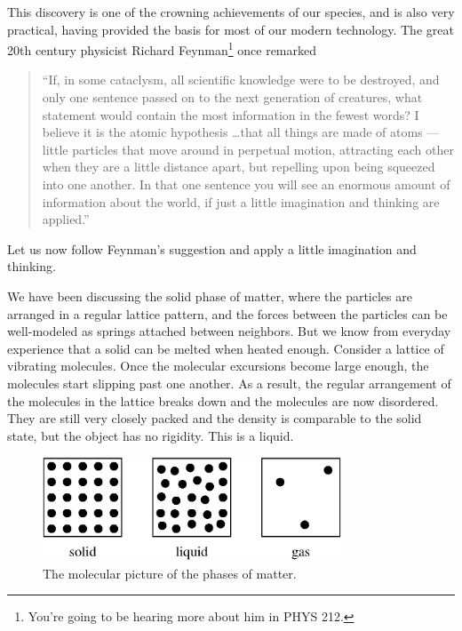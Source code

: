 This discovery is one of the crowning achievements of our species, and
is also very practical, having provided the basis for most of our
modern technology.  The great 20th century physicist Richard
Feynman\footnote{You're going to be hearing more about him in PHYS
  212.} once remarked
\begin{quote}
  ``If, in some cataclysm, all scientific knowledge were to be
  destroyed, and only one sentence passed on to the next generation of
  creatures, what statement would contain the most information in the
  fewest words? I believe it is the atomic hypothesis \dots that all
  things are made of atoms --- little particles that move around in
  perpetual motion, attracting each other when they are a little
  distance apart, but repelling upon being squeezed into one
  another. In that one sentence you will see an enormous amount of
  information about the world, if just a little imagination and
  thinking are applied.''
\end{quote}
Let us now follow Feynman's suggestion and apply a little
imagination and thinking.

We have been discussing the solid phase of matter, where the particles
are arranged in a regular lattice pattern, and the forces between the
particles can be well-modeled as springs attached between neighbors.
But we know from everyday experience that a solid can be melted when
heated enough.  Consider a lattice of vibrating molecules.  Once the
molecular excursions become large enough, the molecules start slipping
past one another.  As a result, the regular arrangement of the
molecules in the lattice breaks down and the molecules are now
disordered.  They are still very closely packed and the density is
comparable to the solid state, but the object has no rigidity.  This
is a liquid.


\begin{figure}
\begin{center}
\includegraphics[width=3.5in]{liquids_and_gases/phases.eps}
\caption{The molecular picture of the phases of matter.}
\label{fig:phases}
\end{center}
\end{figure}


